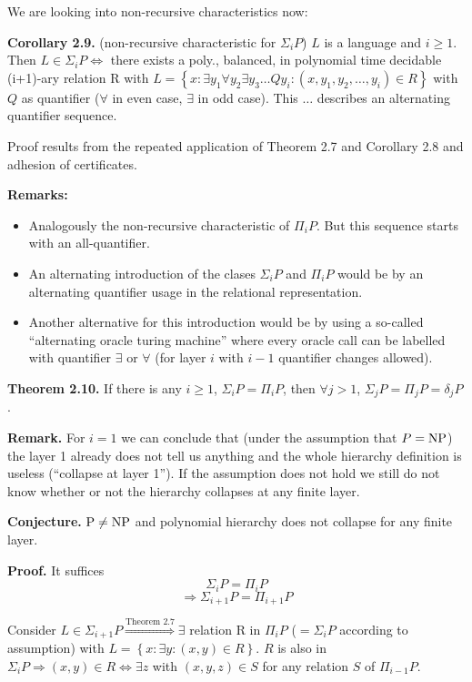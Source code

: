 \documentclass[a4paper]{article}
\newcommand{\cls}[1]{\rm{#1}}
\newcommand{\set}[1]{\left\{#1\right\}}
\begin{document}
We are looking into non-recursive characteristics now:

\textbf{Corollary 2.9.} (non-recursive characteristic for $\Sigma_i P$)
$L$ is a language and $i \geq 1$. Then $L \in \Sigma_i P \Leftrightarrow$
there exists a poly., balanced, in polynomial time decidable (i+1)-ary relation
R with $L = \set{x : \exists y_1 \forall y_2 \exists y_3 \ldots Q y_i:
(x, y_1, y_2, \ldots, y_i) \in R}$ with $Q$ as quantifier ($\forall$ in even case,
$\exists$ in odd case). This $\ldots$ describes an alternating quantifier sequence.

Proof results from the repeated application of Theorem 2.7 and Corollary 2.8
and adhesion of certificates.

\textbf{Remarks:}
\begin{itemize}
  \item Analogously the non-recursive characteristic of $\Pi_i P$.
        But this sequence starts with an all-quantifier.
  \item An alternating introduction of the clases $\Sigma_i P$ and $\Pi_i P$
        would be by an alternating quantifier usage in the relational
        representation.
  \item Another alternative for this introduction would be by using a
        so-called ``alternating oracle turing machine'' where every oracle
        call can be labelled with quantifier $\exists$ or $\forall$
        (for layer $i$ with $i-1$ quantifier changes allowed).
\end{itemize}

\textbf{Theorem 2.10.}
If there is any $i \geq 1$, $\Sigma_i P = \Pi_i P$, then
$\forall j > 1$, $\Sigma_j P = \Pi_j P = \delta_j P$.

\textbf{Remark.}
For $i = 1$ we can conclude that (under the assumption that
$P = \cls{NP}$) the layer 1 already does not tell us anything and
the whole hierarchy definition is useless (``collapse at layer 1'').
If the assumption does not hold we still do not know whether
or not the hierarchy collapses at any finite layer.

\textbf{Conjecture.}
$\cls{P} \neq \cls{NP}$ and polynomial hierarchy does not collapse for any
finite layer.

\textbf{Proof.}
It suffices
\[
  \Sigma_i P = \Pi_i P
\] \[
  \Rightarrow \Sigma_{i+1} P = \Pi_{i+1} P
\]

Consider $L \in \Sigma_{i+1} P \stackrel{\text{Theorem 2.7}}{\Rightarrow}
\exists $ relation R in $\Pi_i P$ ($= \Sigma_i P$ according to assumption)
with $L = \set{x: \exists y: (x, y) \in R}$. $R$ is also in $\Sigma_i P
\Rightarrow (x, y) \in R \Leftrightarrow \exists z$ with $(x, y, z) \in S$
for any relation $S$ of $\Pi_{i-1} P$.
\end{document}
